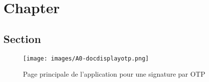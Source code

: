 \chapter{Chapter}

\section{Section}

\begin{figure}[h]
	\begin{center}
		\centerline{\texttt{[image: images/A0-docdisplayotp.png]}}
	\end{center}
	\caption{Page principale de l'application pour une signature par OTP}
\end{figure}
